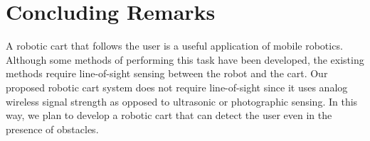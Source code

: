 \documentclass[letterpaper,12pt]{article}   %
\begin{document}






\section{Concluding Remarks}
A robotic cart that follows the user is a useful application of mobile robotics. Although some methods of performing this task have been developed, the existing methods require line-of-sight sensing between the robot and the cart. Our proposed robotic cart system does not require line-of-sight since it uses analog wireless signal strength as opposed to ultrasonic or photographic sensing. In this way, we plan to develop a robotic cart that can detect the user even in the presence of obstacles.

\pagebreak


\end{document}
